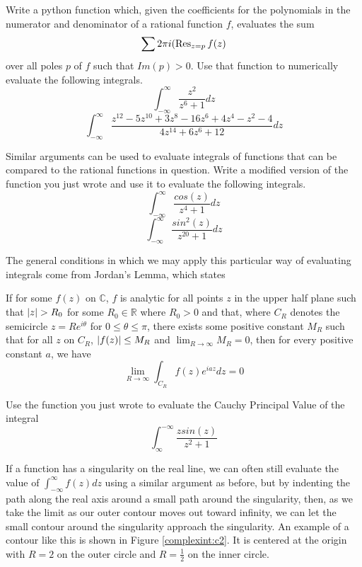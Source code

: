 \begin{problem}
Write a python function which, given the coefficients for the polynomials in the numerator and denominator of a rational function $f$, evaluates the sum
\begin{equation*}
\sum 2\pi i (\operatorname{Res}_{z=p} f(z)
\end{equation*}
over all poles $p$ of $f$ such that $Im(p)>0$.
Use that function to numerically evaluate the following integrals.
$$\int_{-\infty}^{\infty} \frac{z^2}{z^6+1}dz$$
$$\int_{-\infty}^{\infty} \frac{z^{12}-5z^{10}+3z^8-16z^6+4z^4-z^2-4}{4z^{14}+6z^6+12}dz$$
\end{problem}

\begin{problem}
Similar arguments can be used to evaluate integrals of functions that can be compared to the rational functions in question.
Write a modified version of the function you just wrote and use it to evaluate the following integrals.
$$\int_{-\infty}^{\infty}\frac{cos(z)}{z^4+1}dz$$
$$\int_{-\infty}^{\infty}\frac{sin^2(z)}{z^{20}+1}dz$$
\end{problem}

The general conditions in which we may apply this particular way of evaluating integrals come from Jordan's Lemma, which states
\begin{lemma}
If for some $f(z)$ on $\mathbb{C}$, $f$ is analytic for all points $z$ in the upper half plane such that $\left\lvert z\right\rvert>R_0$ for some $R_0 \in \mathbb{R}$ where $R_0 >0$ and that, where $C_R$ denotes the semicircle $z=Re^{i\theta}$ for $0\leq \theta \leq \pi$, there exists some positive constant $M_R$ such that for all $z$ on $C_R$, $\left\lvert f(z)\right\rvert \leq M_R$ and $\lim_{R \to \infty} M_R = 0$, then for every positive constant $a$, we have
$$\lim_{R \to \infty} \int_{C_R} f(z) e^{iaz} dz = 0$$
\end{lemma}
\begin{problem}
Use the function you just wrote to evaluate the Cauchy Principal Value of the integral
$$\int_{\infty}^{-\infty} \frac{z sin(z)}{z^2+1}$$
\end{problem}

If a function has a singularity on the real line, we can often still evaluate the value of $\int_{-\infty}^{\infty} f(z) dz$ using a similar argument as before, but by indenting the path along the real axis around a small path around the singularity, then, as we take the limit as our outer contour moves out toward infinity, we can let the small contour around the singularity approach the singularity.
An example of a contour like this is shown in Figure \ref{complexint:c2}.
It is centered at the origin with $R=2$ on the outer circle and $R=\frac{1}{2}$ on the inner circle.

